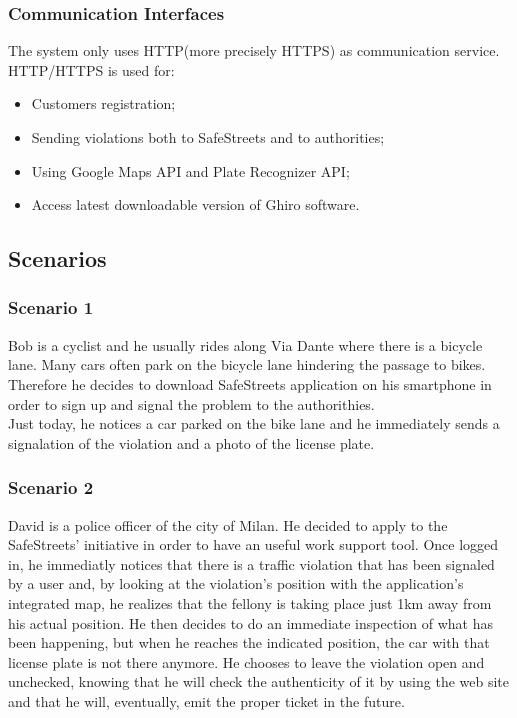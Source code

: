 \documentclass{article}
\begin{document}
\subsubsection{Communication Interfaces}
The system only uses HTTP(more precisely HTTPS) as communication service.
HTTP/HTTPS is used for:
\begin{itemize}
    \item Customers registration;
    \item Sending violations both to SafeStreets and to authorities;
    \item Using Google Maps API and Plate Recognizer API;
    \item Access latest downloadable version of Ghiro software.
\end{itemize}
\subsection{Scenarios}
\subsubsection{Scenario 1}
Bob is a cyclist and he usually rides along Via Dante where there is a bicycle
lane. Many cars often park on the bicycle lane hindering the passage to bikes.
Therefore he decides to download SafeStreets application on his smartphone in
order to sign up and signal the problem to the authorithies.\\ Just today, he
notices a car parked on the bike lane and he immediately sends a signalation of
the violation and a photo of the license plate.
\subsubsection{Scenario 2}
David is a police officer of the city of Milan. He decided to apply to the
SafeStreets’ initiative in order to have an useful work support tool. Once
logged in, he immediatly notices that there is a traffic violation that has been
signaled by a user and, by looking at the violation’s position with the
application’s integrated map, he realizes that the fellony is taking place just
1km away from his actual position. He then decides to do an immediate inspection
of what has been happening, but when he reaches the indicated position, the car
with that license plate is not there anymore. He chooses to leave the violation
open and unchecked, knowing that he will check the authenticity of it by using
the web site and that he will, eventually, emit the proper ticket in the future.
\end{document}
